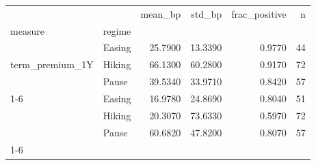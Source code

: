 \begin{tabular}{llrrrr}
\toprule
 &  & mean\_bp & std\_bp & frac\_positive & n \\
measure & regime &  &  &  &  \\
\midrule
\multirow[t]{3}{*}{term\_premium\_1Y} & Easing & 25.7900 & 13.3390 & 0.9770 & 44 \\
 & Hiking & 66.1300 & 60.2800 & 0.9170 & 72 \\
 & Pause & 39.5340 & 33.9710 & 0.8420 & 57 \\
\cline{1-6}
\multirow[t]{3}{*}{vrp\_3M} & Easing & 16.9780 & 24.8690 & 0.8040 & 51 \\
 & Hiking & 20.3070 & 73.6330 & 0.5970 & 72 \\
 & Pause & 60.6820 & 47.8200 & 0.8070 & 57 \\
\cline{1-6}
\bottomrule
\end{tabular}
